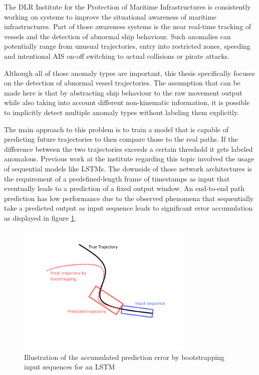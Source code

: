 The DLR Institute for the Protection of Maritime Infrastructures is consistently working on systems to improve the situational awareness of maritime infrastructures. Part of those awareness systems is the near real-time tracking of vessels and the detection of abnormal ship behaviour. Such anomalies can potentially range from unusual trajectories, entry into restricted zones, speeding and intentional AIS on-off switching to actual collisions or pirate attacks.
\par
Although all of those anomaly types are important, this thesis specifically focuses on the detection of abnormal vessel trajectories.  The assumption that can be made here is that by abstracting ship behaviour to the raw movement output while also taking into account different non-kinematic information, it is possible to implicitly detect multiple anomaly types without labeling them explicitly. 
\par
The main approach to this problem is to train a model that is capable of predicting future  trajectories to then compare those to the real paths. If the difference between the two trajectories exceeds a certain threshold it gets labeled anomalous. Previous work at the institute regarding this topic involved the usage of sequential models like LSTMs. The downside of those network architectures is the requirement of a predefined-length frame of timestamps as input that eventually leads to a prediction of a fixed output window. An end-to-end path prediction has low performance due to the observed phenomena that sequentially take a predicted output as input sequence leads to significant error accumulation as displayed in figure \ref{fig:lstm}. 
\begin{figure}[H]
    \centering
    \includegraphics[width=0.75\textwidth]{images/LSTM_trajectory_window_example.png}
    \caption{Illustration of the accumulated prediction error by bootstrapping input sequences for an LSTM}
    \label{fig:lstm}
\end{figure}

